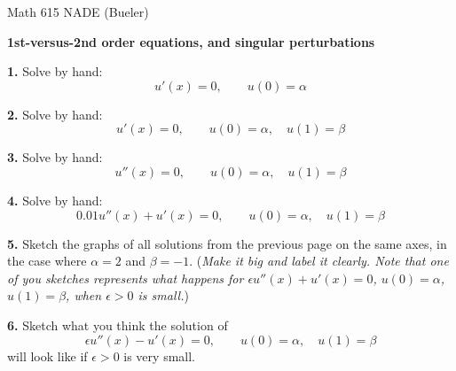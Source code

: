 \documentclass[11pt]{amsart}
\newcommand{\eps}{\epsilon}
\newcommand{\prob}[1]{\bigskip\noindent\textbf{#1}\quad }
\begin{document}
\scriptsize \noindent Math 615 NADE (Bueler) \hfill {}
\normalsize\medskip

\Large\centerline{\textbf{1st-versus-2nd order equations, and singular perturbations}}
\medskip
\normalsize

\thispagestyle{empty}

\medskip

\prob{1.} Solve by hand:
    $$u'(x) = 0, \qquad u(0) = \alpha$$
\vfill

\prob{2.} Solve by hand:
    $$u'(x) = 0, \qquad u(0) = \alpha, \quad u(1) = \beta$$
\vfill

\prob{3.} Solve by hand:
    $$u''(x) = 0, \qquad u(0) = \alpha, \quad u(1) = \beta$$
\vfill

\prob{4.} Solve by hand:
    $$0.01 u''(x) + u'(x) = 0, \qquad u(0) = \alpha, \quad u(1) = \beta$$
\vspace{3.0in}

\clearpage
\newpage
\prob{5.}  Sketch the graphs of all solutions from the previous page on the same axes, in the case where $\alpha=2$ and $\beta=-1$.  (\emph{Make it big and label it clearly.  Note that one of you sketches represents what happens for $\eps u''(x) + u'(x) = 0$, $u(0) = \alpha$, $u(1) = \beta$, when $\eps>0$ is small.})
\vfill

\prob{6.}  Sketch what you think the solution of
    $$\eps u''(x) - u'(x) = 0, \qquad u(0) = \alpha, \quad u(1) = \beta$$
will look like if $\eps>0$ is very small.
\vspace{3.0in}
\end{document}
